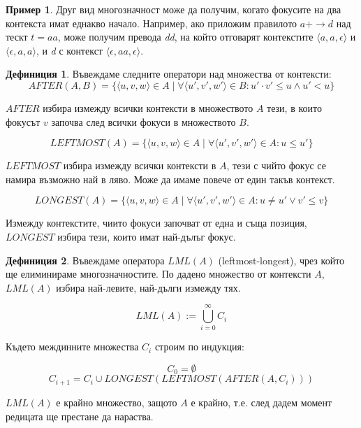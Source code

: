 \documentclass[12pt, oneside]{article}
\theoremstyle{definition}
\newtheorem{definition}{Дефиниция}[section]
\newtheorem{example}{Пример}[section]
\begin{document}
\begin{example}
	Друг вид многозначност може да получим, когато фокусите на два контекста имат еднакво начало. Например, ако приложим правилото \(a+ \to d \) над тескт \( t = aa \), може получим превода \emph{dd}, на който отговарят контекстите \( \langle a, a, \epsilon \rangle \) и \( \langle \epsilon, a, a \rangle \), и \emph{d} с контекст \( \langle \epsilon, aa, \epsilon \rangle \).
\end{example}
\begin{definition}
	Въвеждаме следните оператори над множества от контексти:
\[ AFTER(A, B) = \{ \langle u, v, w \rangle \in A \mid \forall \langle u', v', w' \rangle \in B : u' \cdot v' \leq u \land u' < u  \} \] 

\( AFTER \) избира измежду всички контексти в множеството \(A\) тези, в които фокусът \(v\) започва след всички фокуси в множеството \(B\).

\[ LEFTMOST(A) = \{ \langle u, v, w \rangle \in A \mid \forall \langle u', v', w' \rangle \in A : u \leq u' \} \]

\( LEFTMOST \) избира измежду всички контексти в \(A\), тези с чийто фокус се намира възможно най в ляво. Може да имаме повече от един такъв контекст.

\[ LONGEST(A) = \{ \langle u, v, w \rangle \in A \mid \forall \langle u', v', w' \rangle \in A : u \neq u' \lor v' \leq v \} \]

Измежду контекстите, чиито фокуси започват от една и съща позиция, \( LONGEST \) избира тези, които имат най-дълъг фокус.
\end{definition}

\begin{definition}
	Въвеждаме оператора \( LML(A) \) (leftmost-longest), чрез който ще елиминираме многозначностите. По дадено множество от контексти \(A\), \( LML(A) \) избира най-левите, най-дълги измежду тях.

	\[ LML(A) := \bigcup\limits_{i=0}^{\infty} C_{i} \]

	Където междинните множества \( C_i \) строим по индукция:

	\[ C_0 = \emptyset \]
	\[ C_{i+1} = C_i \cup LONGEST(LEFTMOST(AFTER(A, C_i))) \]

	\noindent \( LML(A) \) е крайно множество, защото \( A \) е крайно, т.е. след дадем момент редицата ще престане да нараства.
\end{definition}
\end{document}
